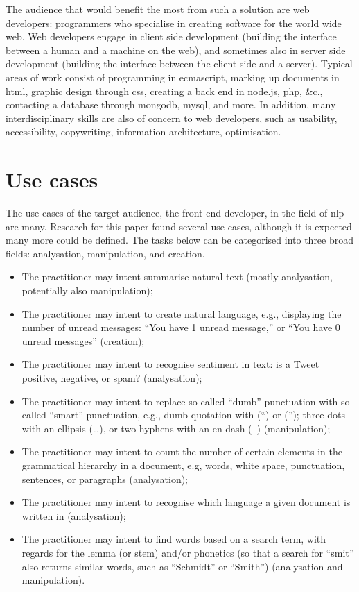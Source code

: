 The audience that would benefit the most from such a solution are web
developers: programmers who specialise in creating software for the
world wide web. Web developers engage in client side development
(building the interface between a human and a machine on the web), and
sometimes also in server side development (building the interface
between the client side and a server). Typical areas of work consist of
programming in \gls{ecmascript}, marking up documents in \gls{html}, graphic
design through \gls{css}, creating a back end in node.js, \gls{php},
\&c., contacting a database through \gls{mongodb}, \gls{mysql}, and
more. In addition, many interdisciplinary skills are also of concern to
web developers, such as usability, accessibility, copywriting,
information architecture, optimisation.

\section{Use cases}\label{use-cases}

The use cases of the target audience, the front-end developer, in the
field of \gls{nlp} are many. Research for this paper found several use
cases, although it is expected many more could be defined. The tasks
below can be categorised into three broad fields: analysation,
manipulation, and creation.

\begin{itemize}
\itemsep1pt\parskip0pt
\item
  The practitioner may intent summarise natural text (mostly
  analysation, potentially also manipulation);
\item
  The practitioner may intent to create natural language, e.g.,
  displaying the number of unread messages: ``You have 1 unread
  message,'' or ``You have 0 unread messages'' (creation);
\item
  The practitioner may intent to recognise sentiment in text: is a Tweet
  positive, negative, or spam? (analysation);
\item
  The practitioner may intent to replace so-called ``dumb'' punctuation
  with so-called ``smart'' punctuation, e.g., dumb quotation with (``)
  or (''); three dots with an ellipsis (\ldots{}), or two hyphens with
  an en-dash (--) (manipulation);
\item
  The practitioner may intent to count the number of certain elements in
  the grammatical hierarchy in a document, e.g, words, white space,
  punctuation, sentences, or paragraphs (analysation);
\item
  The practitioner may intent to recognise which language a given
  document is written in (analysation);
\item
  The practitioner may intent to find words based on a search term, with
  regards for the lemma (or stem) and\slash or phonetics (so that a search
  for ``smit'' also returns similar words, such as ``Schmidt'' or ``Smith'')
  (analysation and manipulation).
\end{itemize}

